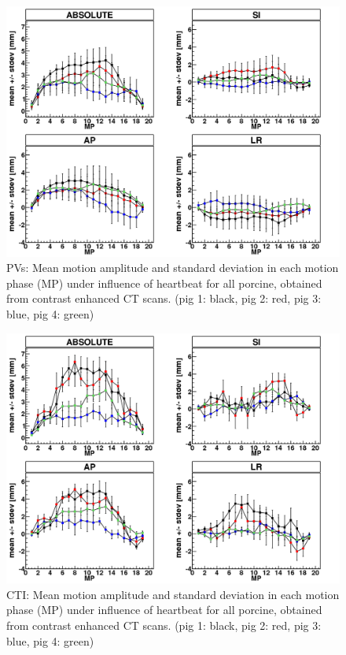 \documentclass[type=dr, dr=rernat, accentcolor=tud7b,colorbacktitle, bigchapter, openright, twoside, 12pt ]{tudthesis}
\begin{document}
\begin{figure}[H]
\begin{center}
 \includegraphics[scale=0.22]{Mayo_PV_HB.png}
\caption{PVs: Mean motion amplitude and standard deviation in each motion phase (MP) under influence of heartbeat for all porcine, obtained 
from contrast enhanced CT scans. (pig 1: black, pig 2: red, pig 3: blue, pig 4: green) }
\label{fig:motion_hb_all_pv}
\end{center}
\end{figure}

\newpage

\begin{figure}[H]
\begin{center}
 \includegraphics[scale=0.22]{Mayo_CTI_HB.png}
\caption{CTI: Mean motion amplitude and standard deviation in each motion phase (MP) under influence of heartbeat for all porcine, obtained 
from contrast enhanced CT scans. (pig 1: black, pig 2: red, pig 3: blue, pig 4: green) }
\label{fig:motion_hb_all_cti}
\end{center}
\end{figure}
\end{document}
